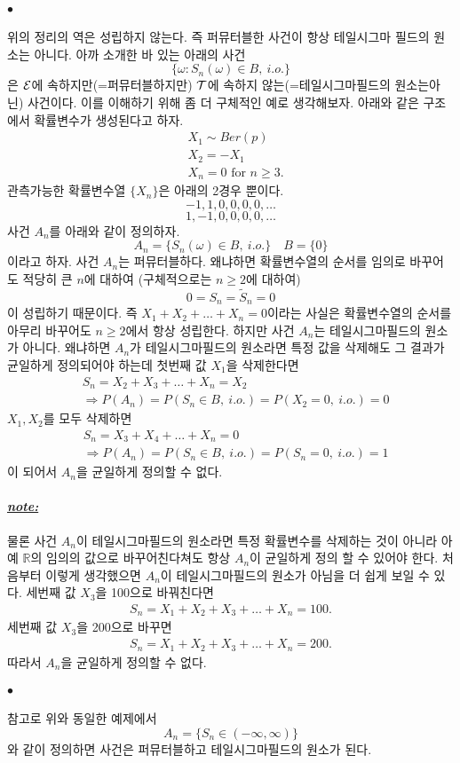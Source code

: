 \documentclass[12pt,oneside,english]{book}
\def\ck{\paragraph{\Large$\bullet$}\Large}
\def\note{\paragraph{\Large\textit{\underline{note:}}}\Large}
\begin{document}
\ck 위의 정리의 역은 성립하지 않는다. 즉 퍼뮤터블한 사건이 항상 테일시그마 필드의 원소는 아니다. 아까 소개한 바 있는 아래의 사건
\[
\{\omega:S_n(\omega) \in B, ~i.o.\}
\]
은 ${\cal E}$에 속하지만(=퍼뮤터블하지만) ${\cal T}$에 속하지 않는(=테일시그마필드의 원소는아닌) 사건이다. 이를 이해하기 위해 좀 더 구체적인 예로 생각해보자. 아래와 같은 구조에서 확률변수가 생성된다고 하자. 
\begin{align*}
& X_1 \sim Ber(p) \\ 
& X_2 = -X_1  \\ 
& X_n = 0 \mbox{ for } n\geq 3.
\end{align*}
관측가능한 확률변수열 $\{X_n\}$은 아래의 2경우 뿐이다. 
\[
-1,1,0,0,0,0,\dots
\] 
\[
1,-1,0,0,0,0,\dots
\] 
사건 $A_n$를 아래와 같이 정의하자. 
\[
A_n=\{S_n(\omega) \in B, ~ i.o.\} \quad B=\{0\}
\] 
이라고 하자. 사건 $A_n$는 퍼뮤터블하다. 왜냐하면 확률변수열의 순서를 임의로 바꾸어도 적당히 큰 $n$에 대하여 (구체적으로는 $n\geq 2$에 대하여) 
\[
0=S_n=\tilde{S}_n=0
\]
이 성립하기 때문이다. 즉 $X_1+X_2+\dots+X_n=0$이라는 사실은 확률변수열의 순서를 아무리 바꾸어도 $n\geq 2$에서 항상 성립한다. 하지만 사건 $A_n$는 테일시그마필드의 원소가 아니다. 왜냐하면 $A_n$가 테일시그마필드의 원소라면 특정 값을 삭제해도 그 결과가 균일하게 정의되어야 하는데 첫번째 값 $X_1$을 삭제한다면 
\begin{align*}
& S_n=X_2+X_3+\dots+X_n= X_2 \\
& \Longrightarrow P(A_n)=P(S_n \in B,~i.o.)=P(X_2=0, ~i.o.)=0
\end{align*}
$X_1,X_2$를 모두 삭제하면 
\begin{align*}
& S_n=X_3+X_4+\dots+X_n=0 \\
& \Longrightarrow P(A_n)=P(S_n \in B,~i.o.)=P(S_n=0, ~i.o.)=1
\end{align*}
이 되어서 $A_n$을 균일하게 정의할 수 없다. 
\note 물론 사건 $A_n$이 테일시그마필드의 원소라면 특정 확률변수를 삭제하는 것이 아니라 아예 $\mathbb{R}$의 임의의 값으로 바꾸어친다쳐도 항상 $A_n$이 균일하게 정의 할 수 있어야 한다. 처음부터 이렇게 생각했으면 $A_n$이 테일시그마필드의 원소가 아님을 더 쉽게 보일 수 있다. 세번째 값 $X_3$을 100으로 바꿔친다면 
\begin{align*}
S_n=X_1+X_2+X_3+\dots+X_n=100.
\end{align*}
세번째 값 $X_3$을 200으로 바꾸면 
\begin{align*}
S_n=X_1+X_2+X_3+\dots+X_n=200.
\end{align*}
따라서 $A_n$을 균일하게 정의할 수 없다. 

\ck 참고로 위와 동일한 예제에서 
\[
A_n=\{S_n \in (-\infty, \infty) \}
\]
와 같이 정의하면 사건은 퍼뮤터블하고 테일시그마필드의 원소가 된다. 
\end{document}
